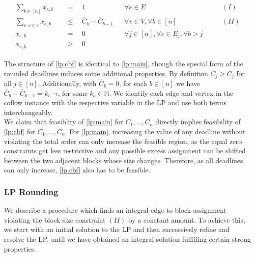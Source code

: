\documentclass[11pt]{article}
\begin{document}
\begin{gather*}\tag{LP CBF}\label{lp:cbf}
\begin{aligned}
\sum_{b \in [n]}x_{e,b} \quad &= \quad 1 &&\forall e \in E &\qquad(I)\\
\sum_{e: v \in e} x_{e,b} \quad&\le \quad \bar{C}_b - \bar{C}_{b-1} &&\forall v \in V,\forall b \in [n]&\qquad(II)\\
x_{e,b} \quad&= \quad 0\quad &&\forall j \in [n],\forall e \in E_j,\forall b > j\\
x_{e,b} \quad&\ge\quad 0
\end{aligned}
\end{gather*}

The structure of \ref{lp:cbf} is identical to \ref{lp:main}, though the special form of the rounded deadlines induces some additional properties. By definition $\bar{C}_j \ge C_j$ for all $j \in [n]$. Additionally, with $\bar{C}_0 = 0$, for each $b \in [n]$ we have $\bar{C}_b - \bar{C}_{b-1} = k_b \cdot  \tau$, for some $k_b \in \mathbb{N}$.
We identify each edge and vertex in the coflow instance with the respective variable in the LP and use both terms interchangeably.\\

We claim that feasiblity of  \ref{lp:main} for $C_1,\dotsc,C_n$ directly implies feasibility of \ref{lp:cbf} for $\bar{C}_1,\dotsc,\bar{C}_n$. For \ref{lp:main}, increasing the value of any deadline without violating the total order can only increase the feasible region, as the equal zero constraints get less restrictive and any possible excess assignment can be shifted between the two adjacent blocks whose size changes. Therefore, as all deadlines can only increase, \ref{lp:cbf} also has to be feasible.

\subsubsection*{LP Rounding}
We describe a procedure which finds an integral edge-to-block assignment violating the block size constraint $(II)$ by a constant amount. To achieve this, we start with an initial solution to the LP and then successively refine and resolve the LP, until we have obtained an integral solution fulfilling certain strong properties.\\
\end{document}
